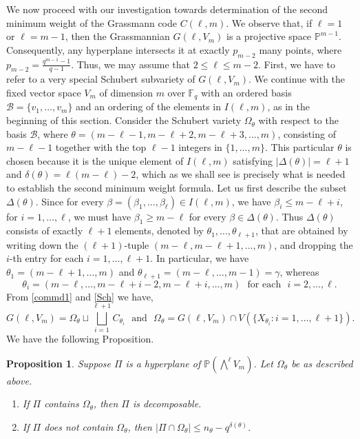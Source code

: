 \documentclass[10pt,a4paper,oneside]{amsproc}
\newtheorem{proposition}[theorem]{Proposition}
\newcommand{\B}{\mathcal{B}}
\newcommand{\Fq}{\mathbb{F}_q}
\def\Fq{{\mathbb F}_q}
\def\PP{{\mathbb P}}
\begin{document}
We now proceed with our investigation towards determination of the second minimum weight of the Grassmann code $C(\ell, m)$. We observe that, if $\ell = 1$ or $\ell = m - 1$, then the Grassmannian $G(\ell, V_m)$ is a projective space $\PP^{m-1}$. Consequently, any hyperplane intersects it at exactly $p_{m-2}$ many points, where $p_{m-2} = \frac{q^{m-1} - 1}{q-1}$. Thus, we may assume that $2 \le \ell \le m - 2$. First, we have to refer to a very special Schubert subvariety of $G(\ell, V_m)$.
We continue with the fixed vector space $V_m$ of dimension $m$ over $\Fq$ with an ordered basis $\B = \{v_1, \dots, v_m\}$ and an ordering of the elements in $I(\ell, m)$, as in the beginning of this section. Consider the Schubert variety $\Omega_\theta$ with respect to the basis $\B$, where $\theta = (m - \ell -1, m - \ell + 2, m-\ell + 3, \dots, m)$, consisting of $m-\ell -1$ together with the top $\ell - 1$ integers in $\{1, \dots, m\}$. This particular $\theta$ is chosen because it is the unique 
element of $I(\ell, m)$ satisfying $|\Delta(\theta)| = \ell + 1$ and $\delta(\theta) = \ell(m - \ell) - 2$, which as we shall 
see is precisely what is needed to establish the second minimum weight formula. Let us first describe the subset $\Delta (\theta)$. Since for every $\beta = (\beta_1, \dots, \beta_\ell) \in I(\ell, m)$, we have $\beta_{i} \le m - \ell + i$, for  $i = 1, \dots, \ell$, we must have $\beta_1 \ge m- \ell$ for every $\beta \in \Delta (\theta)$. Thus $\Delta (\theta)$ consists of exactly $\ell + 1$ elements, denoted by $\theta_1, \dots, \theta_{\ell + 1}$, that are obtained by writing down the $(\ell + 1)$-tuple $(m - \ell, m - \ell + 1, \dots, m)$, and dropping the $i$-th entry for each $i = 1, \dots, \ell + 1$.
In particular, we have $\theta_1 = (m-\ell + 1, \dots, m)$ and  $\theta_{\ell + 1} = (m - \ell, \dots, m-1) = \gamma$, whereas 
$$\theta_i = (m - \ell, \dots, m - \ell + i - 2, m - \ell + i, \dots, m) \ \ \ \text{for each} \ \ \ i = 2, \dots, \ell.$$
From \eqref{commd1} and \eqref{Sch} we have,
\begin{equation}\label{thesch}
G(\ell, V_m) = \Omega_\theta \sqcup \bigsqcup_{i = 1}^{\ell + 1} C_{\theta_i} \ \ \ \text{and} \ \ \ \Omega_\theta = G(\ell, V_m) \cap V(\{X_{\theta_i} : i = 1, \dots, \ell+1\}).
\end{equation}
  We have the following Proposition. 
\begin{proposition}\label{schspec}
    Suppose $\Pi$ is a hyperplane of $\PP\left(\bigwedge^\ell V_{m} \right)$. Let $\Omega_\theta$ be as described above.
    \begin{enumerate}
        \item[(a)]  If $\Pi$ contains $\Omega_{\theta}$, then $\Pi$ is decomposable.  
        \item[(b)] If $\Pi$ does not contain $\Omega_\theta$, then $|\Pi \cap \Omega_\theta| \le n_\theta - q^{\delta(\theta)}$. 
    \end{enumerate}
\end{proposition}
\end{document}
